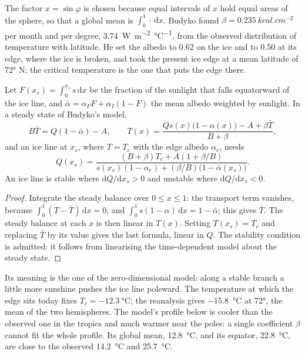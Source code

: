 The factor $x = \sin\varphi$ is chosen because equal intervals of $x$ hold
equal areas of the sphere, so that a global mean is $\int_0^1\cdot\,\mathrm
dx$. Budyko found $\beta = \qty{0.235}{kcal.cm^{-2}}$ per month and per
degree, \qty{3.74}{W.m^{-2}.\celsius^{-1}}, from the observed distribution
of temperature with latitude. He set the albedo to 0.62 on the ice and to 0.50 at its edge,
where the ice is broken, and took the present ice edge at a mean latitude
of \ang{72} N; the critical temperature is the one that puts the edge
there.

\begin{proposition}\label{prop:b3:climate-models:iceline}
Let $F(x_s) = \int_0^{x_s}s\,\mathrm dx$ be the fraction of the sunlight that
falls equatorward of the ice line, and $\bar\alpha = \alpha_FF + \alpha_I(1 -
F)$ the mean albedo weighted by sunlight. In a steady state of Budyko's
model,
\[
B\bar T = Q(1 - \bar\alpha) - A, \qquad
T(x) = \frac{Qs(x)\big(1 - \alpha(x)\big) - A + \beta\bar T}{B + \beta} ,
\]
and an ice line at $x_s$, where $T = T_c$ with the edge albedo $\alpha_e$,
needs
\[
Q(x_s) = \frac{(B + \beta)T_c + A(1 + \beta/B)}{s(x_s)(1 - \alpha_e) +
(\beta/B)\big(1 - \bar\alpha(x_s)\big)} .
\]
An ice line is stable where $\mathrm dQ/\mathrm dx_s > 0$ and unstable
where $\mathrm dQ/\mathrm dx_s < 0$.
\end{proposition}

\begin{proof}
Integrate the steady balance over $0 \le x \le 1$: the transport term
vanishes, because $\int_0^1(T - \bar T)\,\mathrm dx = 0$, and $\int_0^1
s(1 - \alpha)\,\mathrm dx = 1 - \bar\alpha$; this gives $\bar T$. The
steady balance at each $x$ is then linear in $T(x)$. Setting $T(x_s) = T_c$
and replacing $\bar T$ by its value gives the last formula, linear in $Q$.
The stability condition is admitted: it follows from linearising the
time-dependent model about the steady state.
\end{proof}

Its meaning is the one of the zero-dimensional model: along a stable branch
a little more sunshine pushes the ice line poleward. The temperature at
which the edge sits today fixes $T_c = \qty{-12.3}{\celsius}$; the
reanalysis gives \qty{-15.8}{\celsius} at \ang{72}, the mean of the two
hemispheres. The model's profile below is cooler than the observed one in the
tropics and much warmer near the poles: a single coefficient $\beta$ cannot
fit the whole profile. Its global mean,
\qty{12.8}{\celsius}, and its equator, \qty{22.8}{\celsius}, are close to
the observed \qty{14.2}{\celsius} and \qty{25.7}{\celsius}.


